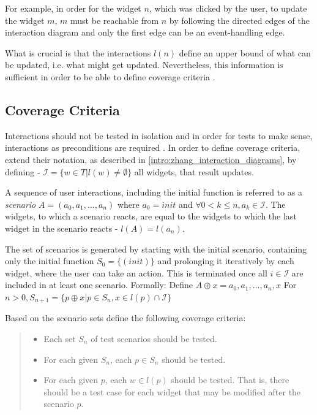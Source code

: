 For example, in order for the widget $n$, which was clicked by the user, to update the widget $m$, $m$ must be reachable from $n$ by following the directed edges of the interaction diagram and only the first edge can be an event-handling edge.

What is crucial is that the interactions $l(n)$ define an upper bound of what can be updated, i.e. what might get updated. Nevertheless, this information is sufficient in order to be able to define coverage criteria \parencite{zhang2019scenario}.

\subsection{Coverage Criteria}
Interactions should not be tested in isolation and in order for tests to make sense, interactions as preconditions are required \parencite{zhang2019scenario}. 
In order to define coverage criteria, \textcite{zhang2019scenario} extend their notation, as described in \ref{intro:zhang_interaction_diagrams}, by defining - $\mathcal{I}  = \{w\in T | l(w) \neq \emptyset \}$ all widgets, that result updates.

A sequence of user interactions, including the initial function is referred to as a \textit{scenario} $A=(a_0,a_1,\ldots, a_n)$ where $a_0=init$ and $\forall0 < k \leq n, a_k \in \mathcal{I}$. The widgets, to which a scenario reacts, are equal to the widgets to which the last widget in the scenario reacts - $l(A)=l(a_n)$. 


The set of scenarios is generated by starting with the initial scenario, containing only the initial function $S_0 = \{(init)\}$ and prolonging it iteratively by each widget, where the user can take an action. This is terminated once all $i \in \mathcal{I}$ are included in at least one scenario. Formally:
Define $A \oplus x = a_0,a_1,\ldots,a_n,x$ For $n > 0, S_{n+1}= \{ p \oplus x |p \in S_n, x \in l(p) \cap \mathcal{I}\}$ 

Based on the scenario sets \textcite{zhang2019scenario} define the following coverage criteria:
\begin{quote}
\begin{itemize}
  \item Each set $S_n$ of test scenarios should be tested.
  \item For each given $S_n$, each $p \in S_n$ should be tested.
  \item For each given $p$, each $w \in l(p)$ should be tested. That is, there should be a
  test case for each widget that may be modified after the scenario $p$.
\end{itemize} 
\end{quote}

